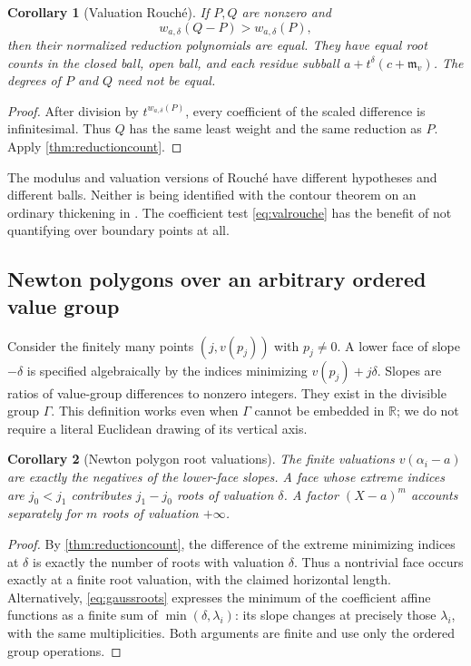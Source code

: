 \documentclass[11pt,letterpaper]{article}
\numberwithin{equation}{section}
\newtheorem{corollary}[corollary]{Corollary}
\theoremstyle{definition}
\theoremstyle{remark}
\newcommand{\R}{\mathbb R}
\newcommand{\mv}{\mathfrak m_v}
\begin{document}
\begin{corollary}[Valuation Rouch\'e]\label{cor:valrouche}
If $P,Q$ are nonzero and
\begin{equation}\label{eq:valrouche}
 w_{a,\delta}(Q-P)>w_{a,\delta}(P),
\end{equation}
then their normalized reduction polynomials are equal. They have equal
root counts in the closed ball, open ball, and each residue subball
$a+t^\delta(c+\mv)$. The degrees of $P$ and $Q$ need not be equal.
\end{corollary}
\begin{proof}
After division by $t^{w_{a,\delta}(P)}$, every coefficient of the scaled
difference is infinitesimal. Thus $Q$ has the same least weight and the
same reduction as $P$. Apply \cref{thm:reductioncount}.
\end{proof}

The modulus and valuation versions of Rouch\'e have different hypotheses
and different balls. Neither is being identified with the contour theorem
on an ordinary thickening in \cite{SourceAnalysis}. The coefficient test
\eqref{eq:valrouche} has the benefit of not quantifying over boundary
points at all.

\subsection{Newton polygons over an arbitrary ordered value group}
Consider the finitely many points $(j,v(p_j))$ with $p_j\ne0$.
A lower face of slope $-\delta$ is specified algebraically by the indices
minimizing $v(p_j)+j\delta$. Slopes are ratios of value-group differences
to nonzero integers. They exist in the divisible group $\Gamma$.
This definition works even when $\Gamma$ cannot be embedded in $\R$;
we do not require a literal Euclidean drawing of its vertical axis.

\begin{corollary}[Newton polygon root valuations]\label{cor:newtonpolygon}
The finite valuations $v(\alpha_i-a)$ are exactly the negatives of the
lower-face slopes. A face whose extreme indices are $j_0<j_1$ contributes
$j_1-j_0$ roots of valuation $\delta$. A factor $(X-a)^m$ accounts
separately for $m$ roots of valuation $+\infty$.
\end{corollary}
\begin{proof}
By \cref{thm:reductioncount}, the difference of the extreme minimizing
indices at $\delta$ is exactly the number of roots with valuation
$\delta$. Thus a nontrivial face occurs exactly at a finite root valuation,
with the claimed horizontal length. Alternatively,
\eqref{eq:gaussroots} expresses the minimum of the coefficient affine
functions as a finite sum of $\min(\delta,\lambda_i)$: its slope changes
at precisely those $\lambda_i$, with the same multiplicities. Both
arguments are finite and use only the ordered group operations.
\end{proof}
\end{document}
